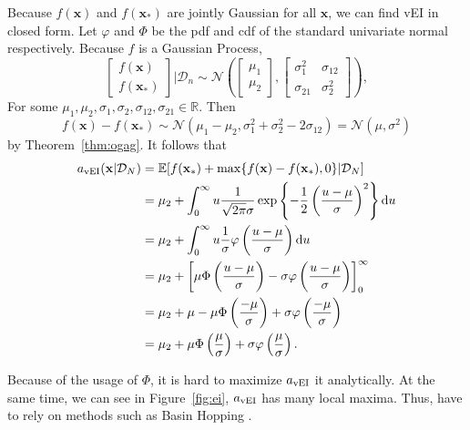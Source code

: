 Because $f(\mathbf{x})$ and $f(\mathbf{x}_*)$ are jointly Gaussian for all $\mathbf{x}$, we can find vEI in closed form.
Let $\varphi$ and $\Phi$ be the pdf and cdf of the standard univariate normal respectively. 
Because $f$ is a Gaussian Process,
\begin{equation*}
    \begin{bmatrix}
        f(\mathbf{x}) \\
        f(\mathbf{x}_*)
    \end{bmatrix}
    \bigg| \mathcal{D}_n
    \sim \mathcal{N}\left(
    \begin{bmatrix}
            \mu_1 \\
            \mu_2
        \end{bmatrix}
    ,
    \begin{bmatrix}
            \sigma_{1}^2 & \sigma_{12} \\
            \sigma_{21} & \sigma^2_2
        \end{bmatrix}
    \right),
\end{equation*}
For some $\mu_1, \mu_2, \sigma_1, \sigma_2, \sigma_{12}, \sigma_{21} \in \mathbb{R}$.
Then
\begin{equation*}
    f(\mathbf{x}) - f\left(\mathbf{x}_*\right) \sim \mathcal{N}(\mu_1 - \mu_2, \sigma_1^2 + \sigma_2^2 - 2\sigma_{12})
    = \mathcal{N}\left(\mu, \sigma^2\right)
\end{equation*}
by Theorem~\ref{thm:ogag}.
It follows that
\begin{align*}
    a_{\mathrm{vEI}}(\mathbf{x} | \mathcal{D}_N)
    & =  \mathbb{E}[f(\mathbf{x}_*) + \max \{  f(\mathbf{x}) - f(\mathbf{x}_*), 0 \} | \mathcal{D}_N] \\
    & = \mu_2 + \int_{0}^\infty u \frac{ 1 }{ \sqrt{2 \pi } \sigma} \exp \left\{ -\frac12 \left(\frac{ u - \mu }{ \sigma }\right)^2 \right\} \mathrm{d} u \\
    & = \mu_2 + \int_{0}^\infty u \frac{ 1 }{ \sigma } \varphi\left(\frac{ u - \mu }{ \sigma }\right) \mathrm{d} u \\
    & = \mu_2 + \left[ \mu \Phi\left(\frac{ u - \mu }{ \sigma }\right) - \sigma \varphi\left(\frac{ u - \mu }{ \sigma }\right)\right]_{0}^{\infty} \\
    & = \mu_2 +  \mu - \mu \Phi\left(\frac{ -\mu }{ \sigma }\right) + \sigma \varphi\left(\frac{ -\mu }{ \sigma }\right) \\
    & = \mu_2 + \mu \Phi\left(\frac{ \mu }{ \sigma }\right) + \sigma \varphi\left(\frac{ \mu }{ \sigma }\right).
\end{align*}

Because of the usage of $\Phi$, it is hard to maximize $a_{\mathrm{vEI}}$ it analytically.
At the same time, we can see in Figure~\ref{fig:ei}, $a_{\mathrm{vEI}}$ has many local maxima.
Thus, have to rely on methods such as Basin Hopping \cite{wales1997}.
